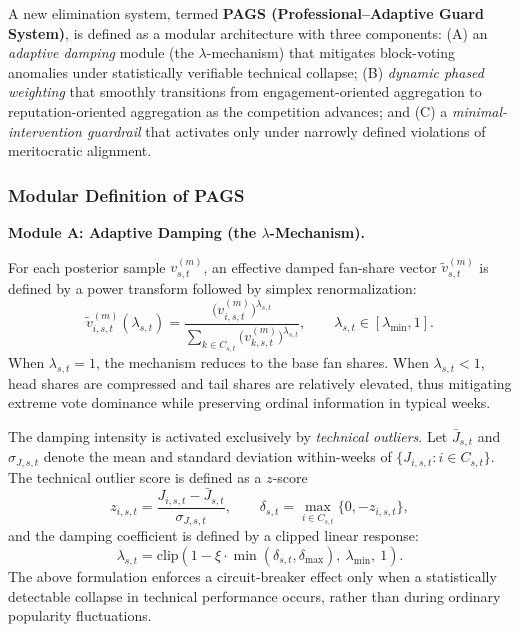 A new elimination system, termed \textbf{PAGS (Professional--Adaptive Guard System)}, is defined as a modular architecture with three components: (A) an \emph{adaptive damping} module (the $\lambda$-mechanism) that mitigates block-voting anomalies under statistically verifiable technical collapse; (B) \emph{dynamic phased weighting} that smoothly transitions from engagement-oriented aggregation to reputation-oriented aggregation as the competition advances; and (C) a \emph{minimal-intervention guardrail} that activates only under narrowly defined violations of meritocratic alignment.

\subsubsection{Modular Definition of PAGS}
\label{sec:q4_modules}


\noindent\textbf{Module A: Adaptive Damping (the $\lambda$-Mechanism).}\label{sec:q4_gamma}


For each posterior sample $v^{(m)}_{s,t}$, an effective damped fan-share vector $\tilde v^{(m)}_{s,t}$ is defined by a power transform followed by simplex renormalization:
\begin{equation}
\tilde v_{i,s,t}^{(m)}(\lambda_{s,t})
=
\frac{\bigl(v_{i,s,t}^{(m)}\bigr)^{\lambda_{s,t}}}{\sum_{k\in C_{s,t}}\bigl(v_{k,s,t}^{(m)}\bigr)^{\lambda_{s,t}}},
\qquad 
\lambda_{s,t}\in[\lambda_{\min},1].
\label{eq:q4_damped_votes}
\end{equation}
When $\lambda_{s,t}=1$, the mechanism reduces to the base fan shares. When $\lambda_{s,t}<1$, head shares are compressed and tail shares are relatively elevated, thus mitigating extreme vote dominance while preserving ordinal information in typical weeks.

The damping intensity is activated exclusively by \emph{technical outliers}. Let $\bar J_{s,t}$ and $\sigma_{J,s,t}$ denote the mean and standard deviation within-weeks of $\{J_{i,s,t}:i\in C_{s,t}\}$. The technical outlier score is defined as a $z$-score
\begin{equation}
z_{i,s,t}=\frac{J_{i,s,t}-\bar J_{s,t}}{\sigma_{J,s,t}},
\qquad 
\delta_{s,t}=\max_{i\in C_{s,t}}\{0,-z_{i,s,t}\},
\label{eq:q4_zscore}
\end{equation}
and the damping coefficient is defined by a clipped linear response:
\begin{equation}
\lambda_{s,t}=\mathrm{clip}\!\left(1-\xi\cdot \min(\delta_{s,t},\delta_{\max}),\ \lambda_{\min},\ 1\right).
\label{eq:q4_gamma_def}
\end{equation}
The above formulation enforces a circuit-breaker effect only when a statistically detectable collapse in technical performance occurs, rather than during ordinary popularity fluctuations.

